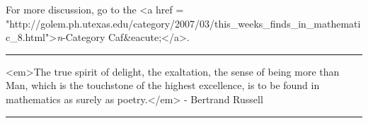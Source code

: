 For more discussion, go to the <a href = "http://golem.ph.utexas.edu/category/2007/03/this_weeks_finds_in_mathematic_8.html">\emph{n}-Category 
Caf&eacute;</a>.

\par\noindent\rule{\textwidth}{0.4pt}
<em>The true spirit of delight, the exaltation, the sense of being more 
than Man, which is the touchstone of the highest excellence, is to 
be found in mathematics as surely as poetry.</em> - Bertrand Russell

\par\noindent\rule{\textwidth}{0.4pt}

